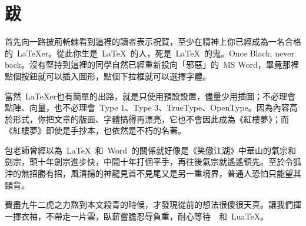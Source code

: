 \chapter{跋}

首先向一路披荊斬棘看到這裡的讀者表示祝賀，至少在精神上你已經成為一名合格的~\LaTeX{}er。從此你生是~\LaTeX~的人，死是~\LaTeX~的鬼。Once Black, never back。沒有堅持到這裡的同學自然已經重新投向「邪惡」的~MS Word，畢竟那裡點個按鈕就可以插入圖形，點個下拉框就可以選擇字體。

當然~\LaTeX{}er也有簡單的出路，就是只使用預設設置，儘量少用插圖；不必理會點陣、向量，也不必理會~Type 1、Type 3、TrueType、OpenType。因為內容高於形式，你把文章的版面、字體搞得再漂亮，它也不會因此成為《紅樓夢》；而《紅樓夢》即使是手抄本，也依然是不朽的名著。

包老師曾經以為~\LaTeX~和~Word~的關係就好像是《笑傲江湖》中華山的氣宗和劍宗，頭十年劍宗進步快，中間十年打個平手，再往後氣宗就遙遙領先。至於令狐沖的無招勝有招，風清揚的神龍見首不見尾又是另一重境界，普通人恐怕只能望其頸背。

費盡九牛二虎之力熬到本文殺青的時候，才發現從前的想法很傻很天真。讓我們揮一揮衣袖，不帶走一片雲，臥薪嘗膽忍辱負重，耐心等待~\XeTeX~和~Lua\TeX。

